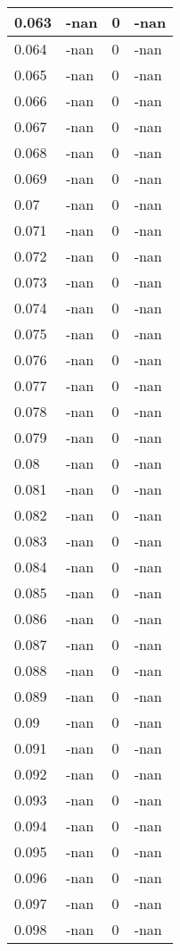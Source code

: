 \documentclass[a4paper,14pt]{extarticle}
\begin{document}
\begin{longtable}{||m{3cm}||m{3cm}|m{3cm}||m{3cm}||}
\hline
0.063 & -nan & 0 & -nan\\
\hline
0.064 & -nan & 0 & -nan\\
\hline
0.065 & -nan & 0 & -nan\\
\hline
0.066 & -nan & 0 & -nan\\
\hline
0.067 & -nan & 0 & -nan\\
\hline
0.068 & -nan & 0 & -nan\\
\hline
0.069 & -nan & 0 & -nan\\
\hline
0.07 & -nan & 0 & -nan\\
\hline
0.071 & -nan & 0 & -nan\\
\hline
0.072 & -nan & 0 & -nan\\
\hline
0.073 & -nan & 0 & -nan\\
\hline
0.074 & -nan & 0 & -nan\\
\hline
0.075 & -nan & 0 & -nan\\
\hline
0.076 & -nan & 0 & -nan\\
\hline
0.077 & -nan & 0 & -nan\\
\hline
0.078 & -nan & 0 & -nan\\
\hline
0.079 & -nan & 0 & -nan\\
\hline
0.08 & -nan & 0 & -nan\\
\hline
0.081 & -nan & 0 & -nan\\
\hline
0.082 & -nan & 0 & -nan\\
\hline
0.083 & -nan & 0 & -nan\\
\hline
0.084 & -nan & 0 & -nan\\
\hline
0.085 & -nan & 0 & -nan\\
\hline
0.086 & -nan & 0 & -nan\\
\hline
0.087 & -nan & 0 & -nan\\
\hline
0.088 & -nan & 0 & -nan\\
\hline
0.089 & -nan & 0 & -nan\\
\hline
0.09 & -nan & 0 & -nan\\
\hline
0.091 & -nan & 0 & -nan\\
\hline
0.092 & -nan & 0 & -nan\\
\hline
0.093 & -nan & 0 & -nan\\
\hline
0.094 & -nan & 0 & -nan\\
\hline
0.095 & -nan & 0 & -nan\\
\hline
0.096 & -nan & 0 & -nan\\
\hline
0.097 & -nan & 0 & -nan\\
\hline
0.098 & -nan & 0 & -nan\\

\end{longtable}
\end{document}
